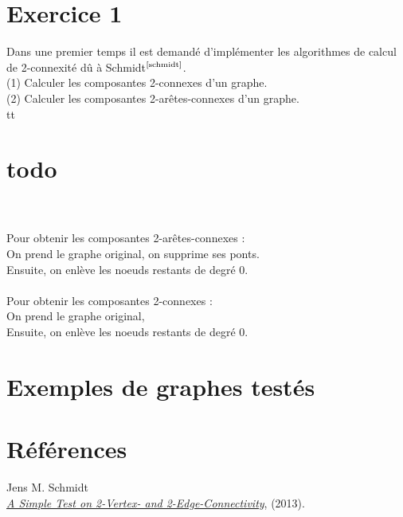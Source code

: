 \documentclass{article}      %
\begin{document}
\section{Exercice 1}
\textcolor{exogris}{
Dans une premier temps il est demandé d’implémenter les algorithmes de calcul de 2-connexité dû à Schmidt$^\text{\cite{schmidt}}$.
\\(1) Calculer les composantes 2-connexes d’un graphe.
\\(2) Calculer les composantes 2-arêtes-connexes d’un graphe.
}
\\tt

\section{todo}

\\\\Pour obtenir les composantes 2-arêtes-connexes :
\\On prend le graphe original, on supprime ses ponts.
\\Ensuite, on enlève les noeuds restants de degré 0.
%
\\\\Pour obtenir les composantes 2-connexes :
\\On prend le graphe original, 
\\Ensuite, on enlève les noeuds restants de degré 0.
\section{Exemples de graphes testés}

\section{Références}
\begin{thebibliography}{9}
Jens M. Schmidt
\\\href{https://arxiv.org/ftp/arxiv/papers/1209/1209.0700.pdf}{\underline{\textit{A Simple Test on 2-Vertex- and 2-Edge-Connectivity}}}, (2013).
\end{thebibliography}
\end{document}

